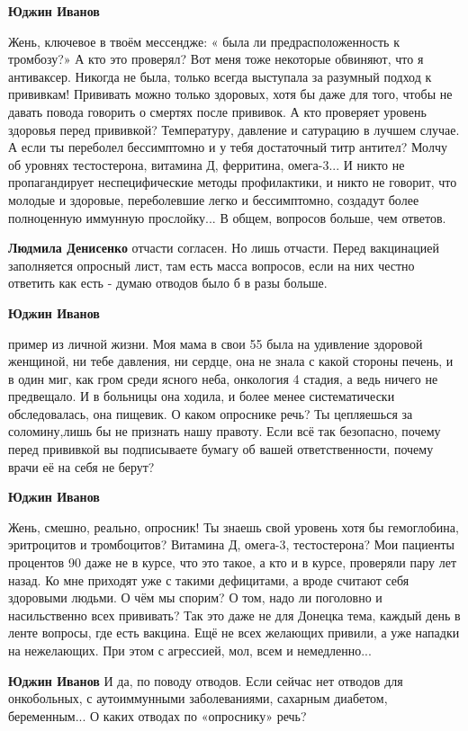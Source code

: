 \begin{itemize}
\begin{itemize}
\textbf{Юджин Иванов} 

Жень, ключевое в твоём мессендже: « была ли предрасположенность к тромбозу?» А
кто это проверял? Вот меня тоже некоторые обвиняют, что я антиваксер. Никогда
не была, только всегда выступала за разумный подход к прививкам! Прививать
можно только здоровых, хотя бы даже для того, чтобы не давать повода говорить о
смертях после прививок. А кто проверяет уровень здоровья перед прививкой?
Температуру, давление и сатурацию в лучшем случае. А если ты переболел
бессимптомно и у тебя достаточный титр антител? Молчу об уровнях тестостерона,
витамина Д, ферритина, омега-3... И никто не пропагандирует неспецифические
методы профилактики, и никто не говорит, что молодые и здоровые, переболевшие
легко и бессимптомно, создадут более полноценную иммунную прослойку... В общем,
вопросов больше, чем ответов.

\textbf{Людмила Денисенко} отчасти согласен. Но лишь отчасти. Перед вакцинацией заполняется опросный лист, там есть масса вопросов, если на них честно ответить как есть - думаю отводов было б в разы больше.

\textbf{Юджин Иванов} 

пример из личной жизни. Моя мама в свои 55 была на удивление здоровой женщиной,
ни тебе давления, ни сердце, она не знала с какой стороны печень, и в один миг,
как гром среди ясного неба, онкология 4 стадия, а ведь ничего не предвещало. И
в больницы она ходила, и более менее систематически обследовалась, она пищевик.
О каком опроснике речь? Ты цепляешься за соломину,лишь бы не признать нашу
правоту. Если всё так безопасно, почему перед прививкой вы подписываете бумагу
об вашей ответственности, почему врачи её на себя не берут?

\textbf{Юджин Иванов} 

Жень, смешно, реально, опросник! Ты знаешь свой уровень хотя бы гемоглобина,
эритроцитов и тромбоцитов? Витамина Д, омега-3, тестостерона? Мои пациенты
процентов 90 даже не в курсе, что это такое, а кто и в курсе, проверяли пару
лет назад. Ко мне приходят уже с такими дефицитами, а вроде считают себя
здоровыми людьми. О чём мы спорим? О том, надо ли поголовно и насильственно
всех прививать? Так это даже не для Донецка тема, каждый день в ленте вопросы,
где есть вакцина. Ещё не всех желающих привили, а уже нападки на нежелающих.
При этом с агрессией, мол, всем и немедленно...

\textbf{Юджин Иванов} И да, по поводу отводов. Если сейчас нет отводов для онкобольных, с аутоиммунными заболеваниями, сахарным диабетом, беременным... О каких отводах по «опроснику» речь?


\end{itemize}
\end{itemize}
